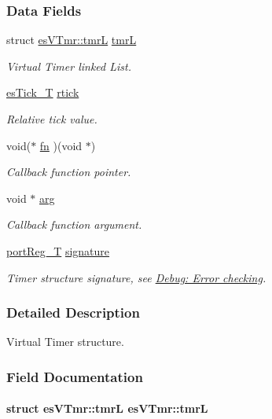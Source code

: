 \subsubsection*{Data Fields}
\begin{DoxyCompactItemize}
\item 
struct \hyperlink{structesVTmr_1_1tmrL}{es\-V\-Tmr\-::tmr\-L} \hyperlink{structesVTmr_aa361779ab411157047bb0933acf2f9ab}{tmr\-L}
\begin{DoxyCompactList}\small\item\em Virtual Timer linked List. \end{DoxyCompactList}\item 
\hyperlink{group__kern__intf_ga844873888c186ee81eb66620dadb0451}{es\-Tick\-\_\-\-T} \hyperlink{structesVTmr_a4bbde49720b6aa0cc97e932ccb0383ea}{rtick}
\begin{DoxyCompactList}\small\item\em Relative tick value. \end{DoxyCompactList}\item 
void($\ast$ \hyperlink{structesVTmr_a17137ebfaf21de24d136b7d9b1390ddc}{fn} )(void $\ast$)
\begin{DoxyCompactList}\small\item\em Callback function pointer. \end{DoxyCompactList}\item 
void $\ast$ \hyperlink{structesVTmr_a4bd88651471b32f1fe71b4cec22756c0}{arg}
\begin{DoxyCompactList}\small\item\em Callback function argument. \end{DoxyCompactList}\item 
\hyperlink{group__template__cpu__intf_ga99980ab56ce9857e7380210d12e3d41f}{port\-Reg\-\_\-\-T} \hyperlink{structesVTmr_a8a620761f277b95ead5fc6f52c898daf}{signature}
\begin{DoxyCompactList}\small\item\em Timer structure signature, see \hyperlink{errors}{Debug\-: Error checking}. \end{DoxyCompactList}\end{DoxyCompactItemize}


\subsubsection{Detailed Description}
Virtual Timer structure. 

\subsubsection{Field Documentation}
\hypertarget{structesVTmr_aa361779ab411157047bb0933acf2f9ab}{
\paragraph[{tmr\-L}]{\setlength{\rightskip}{0pt plus 5cm}struct {\bf es\-V\-Tmr\-::tmr\-L}                {\bf es\-V\-Tmr\-::tmr\-L}}}\label{structesVTmr_aa361779ab411157047bb0933acf2f9ab}


